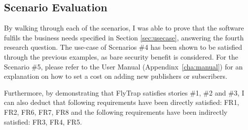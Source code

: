 \subsection{Scenario Evaluation}
By walking through each of the scenarios, I was able to prove that the software fulfils the business needs specified in Section \ref{sec:usecase}, answering the fourth research question. The use-case of Scenarios \#4 has been shown to be satisfied through the previous examples, as bare security benefit is considered. For the Scenario \#5, please refer to the User Manual (Appendinx~\ref{cha:manual}) for an explanation on how to set a cost on adding new publishers or subscribers.

Furthermore, by demonstrating that FlyTrap satisfies stories \#1, \#2 and \#3, I can also deduct that following requirements have been directly satisfied: FR1, FR2, FR6, FR7, FR8 and the following requirements have been indirectly satisfied: FR3, FR4, FR5. 
